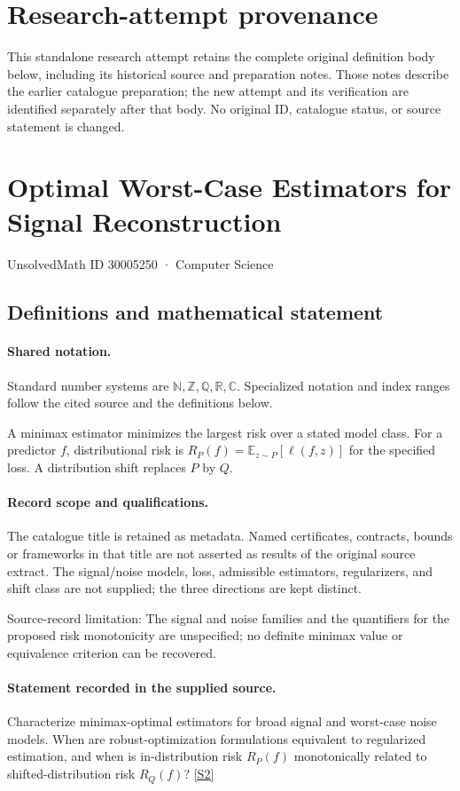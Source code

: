 \documentclass[11pt]{article}
\begin{document}
\section*{Research-attempt provenance}
This standalone research attempt retains the complete original definition body below,
including its historical source and preparation notes. Those notes describe the
earlier catalogue preparation; the new attempt and its verification are identified
separately after that body. No original ID, catalogue status, or source statement is changed.

\section{Optimal Worst-Case Estimators for Signal Reconstruction}\label{30005250}
{\small UnsolvedMath ID 30005250 · Computer Science}
\subsection{Definitions and mathematical statement}

\paragraph{Shared notation.}Standard number systems are $\mathbb N,\mathbb Z,\mathbb Q,\mathbb R,\mathbb C$. Specialized notation and index ranges follow the cited source and the definitions below.


A minimax estimator minimizes the largest risk over a stated model class. For a predictor $f$, distributional risk is $R_P(f)=\mathbb E_{z\sim P}[\ell(f,z)]$ for the specified loss. A distribution shift replaces $P$ by $Q$.
\paragraph{Record scope and qualifications.}
The catalogue title is retained as metadata. Named certificates, contracts, bounds or frameworks in that title are not asserted as results of the original source extract.
The signal/noise models, loss, admissible estimators, regularizers, and shift class are not supplied; the three directions are kept distinct.

Source-record limitation: The signal and noise families and the quantifiers for the proposed risk monotonicity are unspecified; no definite minimax value or equivalence criterion can be recovered.
\paragraph{Statement recorded in the supplied source.}
Characterize minimax-optimal estimators for broad signal and worst-case noise models. When are robust-optimization formulations equivalent to regularized estimation, and when is in-distribution risk $R_P(f)$ monotonically related to shifted-distribution risk $R_Q(f)$? \href{https://doi.org/10.4171/owr/2022/46}{[S2]}
\end{document}
